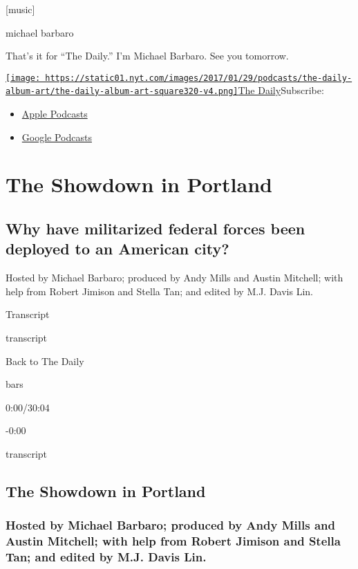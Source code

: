 {[}music{]}

michael barbaro

That's it for ``The Daily.'' I'm Michael Barbaro. See you tomorrow.

\href{https://www.nytimes.com/column/the-daily}{\texttt{[image: https://static01.nyt.com/images/2017/01/29/podcasts/the-daily-album-art/the-daily-album-art-square320-v4.png]}The
Daily}Subscribe:

\begin{itemize}
\tightlist
\item
  \href{https://itunes.apple.com/us/podcast/id1200361736}{Apple
  Podcasts}
\item
  \href{https://www.google.com/podcasts?feed=aHR0cHM6Ly9yc3MuYXJ0MTkuY29tL3RoZS1kYWlseQ\%3D\%3D}{Google
  Podcasts}
\end{itemize}

\hypertarget{the-showdown-in-portland-1}{%
\section{The Showdown in Portland}\label{the-showdown-in-portland-1}}

\hypertarget{why-have-militarized-federal-forces-been-deployed-to-an-american-city-1}{%
\subsection{Why have militarized federal forces been deployed to an
American
city?}\label{why-have-militarized-federal-forces-been-deployed-to-an-american-city-1}}

Hosted by Michael Barbaro; produced by Andy Mills and Austin Mitchell;
with help from Robert Jimison and Stella Tan; and edited by M.J. Davis
Lin.

Transcript

transcript

Back to The Daily

bars

0:00/30:04

-0:00

transcript

\hypertarget{the-showdown-in-portland-2}{%
\subsection{The Showdown in Portland}\label{the-showdown-in-portland-2}}

\hypertarget{hosted-by-michael-barbaro-produced-by-andy-mills-and-austin-mitchell-with-help-from-robert-jimison-and-stella-tan-and-edited-by-mj-davis-lin-1}{%
\subsubsection{Hosted by Michael Barbaro; produced by Andy Mills and
Austin Mitchell; with help from Robert Jimison and Stella Tan; and
edited by M.J. Davis
Lin.}\label{hosted-by-michael-barbaro-produced-by-andy-mills-and-austin-mitchell-with-help-from-robert-jimison-and-stella-tan-and-edited-by-mj-davis-lin-1}}


